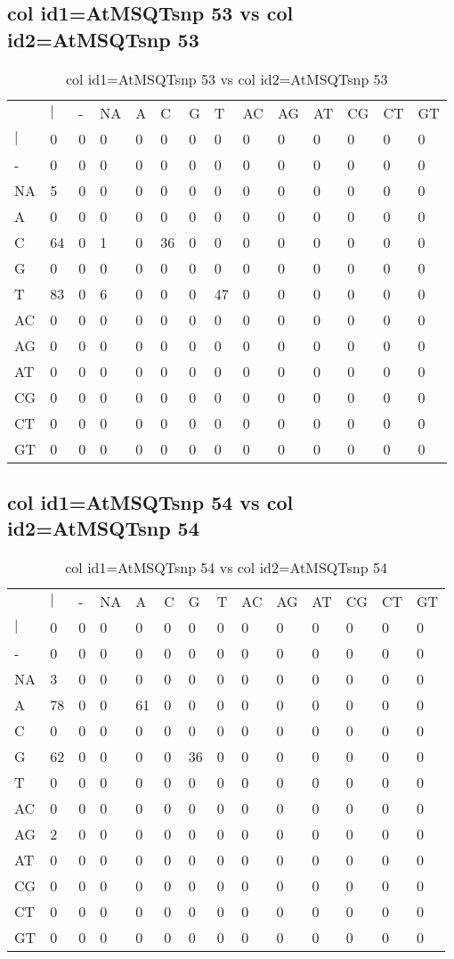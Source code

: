 \subsection{col id1=AtMSQTsnp 53 vs col id2=AtMSQTsnp 53}
\begin{center}
\begin{longtable}{|l|l|l|l|l|l|l|l|l|l|l|l|l|l|}
\caption{col id1=AtMSQTsnp 53 vs col id2=AtMSQTsnp 53} \label{table_dm740}\\
\hline
\\
\hline
&$|$&-&NA&A&C&G&T&AC&AG&AT&CG&CT&GT\\
$|$&0&0&0&0&0&0&0&0&0&0&0&0&0\\
-&0&0&0&0&0&0&0&0&0&0&0&0&0\\
NA&5&0&0&0&0&0&0&0&0&0&0&0&0\\
A&0&0&0&0&0&0&0&0&0&0&0&0&0\\
C&64&0&1&0&36&0&0&0&0&0&0&0&0\\
G&0&0&0&0&0&0&0&0&0&0&0&0&0\\
T&83&0&6&0&0&0&47&0&0&0&0&0&0\\
AC&0&0&0&0&0&0&0&0&0&0&0&0&0\\
AG&0&0&0&0&0&0&0&0&0&0&0&0&0\\
AT&0&0&0&0&0&0&0&0&0&0&0&0&0\\
CG&0&0&0&0&0&0&0&0&0&0&0&0&0\\
CT&0&0&0&0&0&0&0&0&0&0&0&0&0\\
GT&0&0&0&0&0&0&0&0&0&0&0&0&0\\
\hline
\end{longtable}
\end{center}

\subsection{col id1=AtMSQTsnp 54 vs col id2=AtMSQTsnp 54}
\begin{center}
\begin{longtable}{|l|l|l|l|l|l|l|l|l|l|l|l|l|l|}
\caption{col id1=AtMSQTsnp 54 vs col id2=AtMSQTsnp 54} \label{table_dm742}\\
\hline
\\
\hline
&$|$&-&NA&A&C&G&T&AC&AG&AT&CG&CT&GT\\
$|$&0&0&0&0&0&0&0&0&0&0&0&0&0\\
-&0&0&0&0&0&0&0&0&0&0&0&0&0\\
NA&3&0&0&0&0&0&0&0&0&0&0&0&0\\
A&78&0&0&61&0&0&0&0&0&0&0&0&0\\
C&0&0&0&0&0&0&0&0&0&0&0&0&0\\
G&62&0&0&0&0&36&0&0&0&0&0&0&0\\
T&0&0&0&0&0&0&0&0&0&0&0&0&0\\
AC&0&0&0&0&0&0&0&0&0&0&0&0&0\\
AG&2&0&0&0&0&0&0&0&0&0&0&0&0\\
AT&0&0&0&0&0&0&0&0&0&0&0&0&0\\
CG&0&0&0&0&0&0&0&0&0&0&0&0&0\\
CT&0&0&0&0&0&0&0&0&0&0&0&0&0\\
GT&0&0&0&0&0&0&0&0&0&0&0&0&0\\
\hline
\end{longtable}
\end{center}

